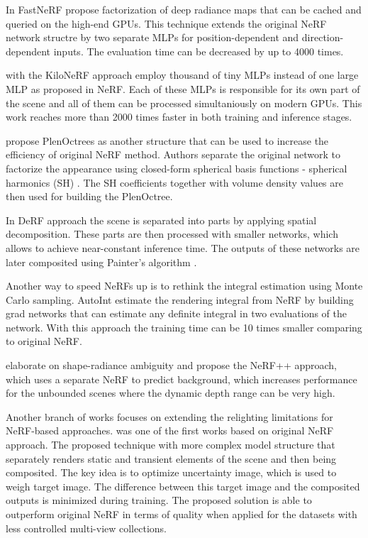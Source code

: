 In FastNeRF \cite{garbin2021fastnerf} propose factorization of deep radiance maps
that can be cached and queried on the high-end GPUs.
This technique extends the original NeRF network structre
by two separate MLPs for position-dependent and direction-dependent inputs.
The evaluation time can be decreased by up to 4000 times.

\cite{reiser2021kilonerf} with the KiloNeRF approach employ thousand of tiny MLPs 
instead of one large MLP as proposed in NeRF.
Each of these MLPs is responsible for its own part of the scene
and all of them can be processed simultaniously on modern GPUs.
This work reaches more than 2000 times faster in both training and inference stages.

\cite{yu2021plenoctrees} propose PlenOctrees as another structure that can be used to increase the efficiency of original NeRF method.
Authors separate the original network to factorize the appearance using closed-form
spherical basis functions - spherical harmonics (SH) \cite{mohlenkamp1997spherical}.
The SH coefficients together with volume density values are then used
for building the PlenOctree.

In DeRF approach \cite{rebain2020derf} the scene is separated into parts by applying spatial decomposition.
These parts are then processed with smaller networks, which allows to achieve near-constant inference time.
The outputs of these networks are later composited using Painter's algorithm \cite{deBerg2008}.

Another way to speed NeRFs up is to rethink the integral estimation using Monte Carlo sampling.
AutoInt \cite{lindell2021autoint} estimate the rendering integral from NeRF
by building grad networks that can estimate any definite integral in two evaluations of the network.
With this approach the training time can be 10 times smaller comparing to original NeRF.

\cite{zhang2020nerf} elaborate on shape-radiance ambiguity
and propose the NeRF++ approach, which uses a separate NeRF to predict background,
which increases performance for the unbounded scenes where the dynamic depth range can be very high.




Another branch of works focuses on extending the relighting limitations for NeRF-based approaches.
\cite{martinbrualla2021nerfw} was one of the first works based on original NeRF approach.
The proposed technique with more complex model structure
that separately renders static and transient elements of the scene
and then being composited.
The key idea is to optimize uncertainty image, which is used to weigh target image.
The difference between this target image and the composited outputs is minimized during training.
The proposed solution is able to outperform original NeRF in terms of quality
when applied for the datasets with less controlled multi-view collections.

